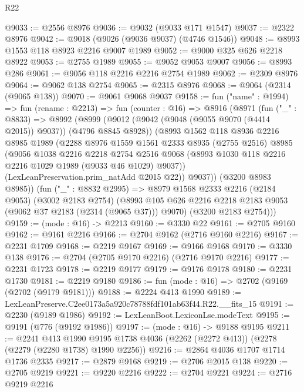 \begin{lexlean}{R22}
\begin{coremodule}
@9033 := @2556 @8976
@9036 := @9032 (@9033 @171 @1547)
@9037 := @2322 @8976
@9042 := @9018 (@9026 (@9036 @9037) (@4746 @1546))
@9048 := @8993 @1553 @118 @8923 @2216 @9007 @1989
@9052 := @9000 @325 @626 @2218 @8922
@9053 := @2755 @1989
@9055 := @9052 @9053 @9007
@9056 := @8993 @286
@9061 := @9056 @118 @2216 @2216 @2754 @1989
@9062 := @2309 @8976
@9064 := @9062 @138 @2754
@9065 := @2315 @8976
@9068 := @9064 (@2314 (@9065 @138))
@9070 := @9061 @9068 @9037
@9158 := fun ("name" : @1994) =>
  fun (rename : @2213) =>
  fun (counter : @16) =>
  @8916
    (@8971
      (fun ("_" : @8833) =>
      @8992
        (@8999
          (@9012 (@9042 (@9048 (@9055 @9070 (@4414 @2015)) @9037)) (@4796 @8845 @8928))
          (@8993
            @1562
            @118
            @8936
            @2216
            @8985
            @1989
            (@2288
              @8976
              @1559
              @1561
              @2333
              @8935
              (@2755 @2516)
              @8985
              (@9056
                @1038
                @2216
                @2218
                @2754
                @2516
                @9068
                (@8993 @1030 @118 @2216 @2216 @1029 @1989 (@9033 @46 @1029) @9037))
              (LexLeanPreservation.prim_natAdd @2015 @22))
            @9037))
        (@3200 @8983 @8985))
      (fun ("_" : @8832 @2995) =>
      @8979
        @1568
        @2333
        @2216
        (@2184 @9053)
        (@3002 @2183 @2754)
        (@8993 @105 @626 @2216 @2218 @2183 @9053 (@9062 @37 @2183 (@2314 (@9065 @37))) @9070)
        (@3200 @2183 @2754)))
@9159 := (mode : @16) -> @2213
@9160 := @3330 @22
@9161 := @2705 @9160
@9162 := @9161 @2216
@9166 := @2704 @9162 (@2716 @9160 @2216)
@9167 := @2231 @1709
@9168 := @2219 @9167
@9169 := @9166 @9168
@9170 := @3330 @138
@9176 := @2704 (@2705 @9170 @2216) (@2716 @9170 @2216)
@9177 := @2231 @1723
@9178 := @2219 @9177
@9179 := @9176 @9178
@9180 := @2231 @1730
@9181 := @2219 @9180
@9186 := fun (mode : @16) => @2702 (@9169 (@2702 (@9179 @9181)))
@9188 := @2224 @413 @1990
@9189 := LexLeanPreserve.C2ee0173a5a920c78788fdf101ab63f44.R22.__fits_15
@9191 := @2230 (@9189 @1986)
@9192 := LexLeanBoot.LexiconLse.modeText
@9195 := @9191 (@776 (@9192 @1986))
@9197 := (mode : @16) -> @9188 @9195
@9211 := @2241
    @413
    @1990
    @9195
    @1738
    @4036
    (@2262 (@2272 @413))
    (@2278 (@2279 (@2280 @1738) @1990 @2256))
@9216 := @2864 @4036 @1707 @1714 @1736 @2335
@9217 := @2879 @9168
@9219 := @2706 @2015 @138
@9220 := @2705 @9219
@9221 := @9220 @2216
@9222 := @2704 @9221
@9224 := @2716 @9219 @2216

\end{coremodule}
\end{lexlean}
